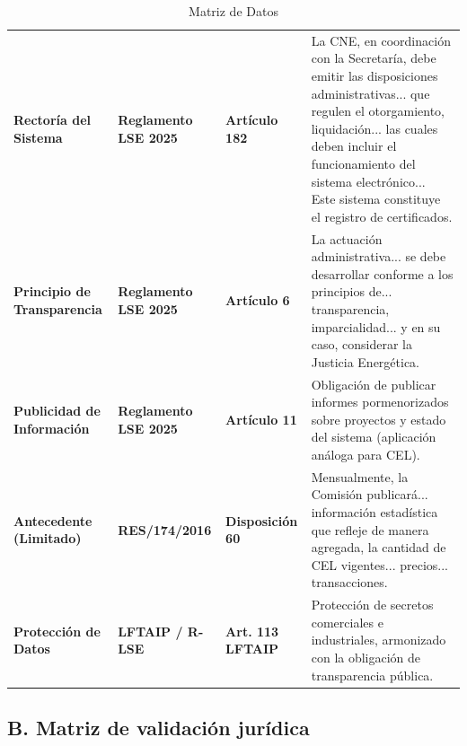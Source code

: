 \documentclass{cel}
\begin{document}
\vspace{0.3cm}
\begin{tabladoradoLargo}
\renewcommand{\tabularxcolumn}[1]{p{#1}}
\begin{xltabular}{\textwidth}{|X|X|X|X|}
\caption{Matriz de Datos} \\
\toprule
{}  &  &  &  \\
\midrule
\endhead
\textbf{Rectoría del Sistema} & \textbf{Reglamento LSE 2025} & \textbf{Artículo 182} & \textquotedbl{}La CNE, en coordinación con la Secretaría, debe emitir las disposiciones administrativas... que regulen el otorgamiento, liquidación... las cuales deben incluir el funcionamiento del sistema electrónico... Este sistema constituye el registro de certificados.\textquotedbl{} \\ \hline
\textbf{Principio de Transparencia} & \textbf{Reglamento LSE 2025} & \textbf{Artículo 6} & \textquotedbl{}La actuación administrativa... se debe desarrollar conforme a los principios de... transparencia, imparcialidad... y en su caso, considerar la Justicia Energética.\textquotedbl{} \\ \hline
\textbf{Publicidad de Información} & \textbf{Reglamento LSE 2025} & \textbf{Artículo 11} & Obligación de publicar informes pormenorizados sobre proyectos y estado del sistema (aplicación análoga para CEL). \\ \hline
\textbf{Antecedente (Limitado)} & \textbf{RES/174/2016} & \textbf{Disposición 60} & \textquotedbl{}Mensualmente, la Comisión publicará... información estadística que refleje de manera agregada, la cantidad de CEL vigentes... precios... transacciones.\textquotedbl{} \\ \hline
\textbf{Protección de Datos} & \textbf{LFTAIP / R-LSE} & \textbf{Art. 113 LFTAIP} & Protección de secretos comerciales e industriales, armonizado con la obligación de transparencia pública. \\ \hline
\bottomrule
\end{xltabular}
\end{tabladoradoLargo}

\vspace{0.4cm}
\subsection{B. Matriz de validación jurídica}
\nopagebreak
\end{document}
